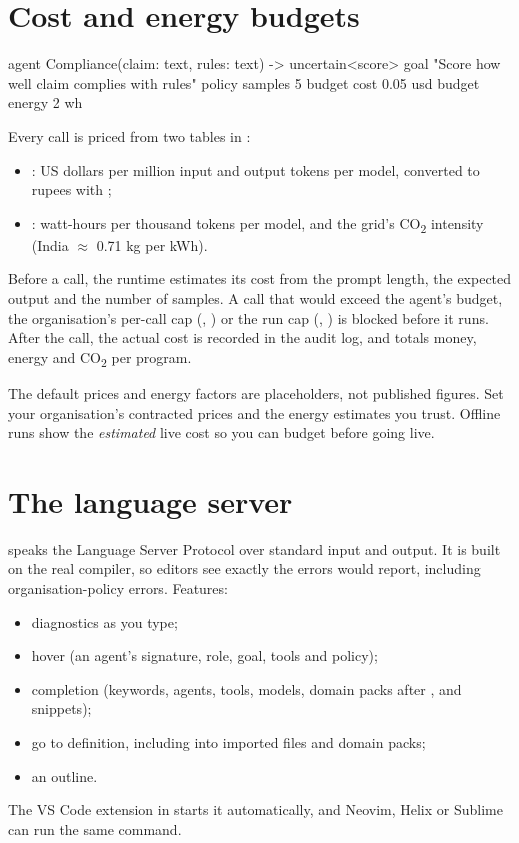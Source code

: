 \section{Cost and energy budgets}

\begin{algo}[title=Budgets]
agent Compliance(claim: text, rules: text) -> uncertain<score> {
    goal   "Score how well {claim} complies with {rules}"
    policy { samples 5  budget cost 0.05 usd  budget energy 2 wh }
}
\end{algo}

Every call is priced from two tables in :
\begin{itemize}
\item {}: US dollars per million input and output tokens per model, converted to rupees with ;
\item {}: watt-hours per thousand tokens per model, and the grid's CO\textsubscript{2} intensity (India $\approx$ 0.71 kg per kWh).
\end{itemize}

Before a call, the runtime estimates its cost from the prompt length, the expected output and the number of samples. A call that would exceed the agent's budget, the organisation's per-call cap (, ) or the run cap (, ) is blocked before it runs. After the call, the actual cost is recorded in the audit log, and  totals money, energy and CO\textsubscript{2} per program.

\begin{ethics}
The default prices and energy factors are placeholders, not published figures. Set your organisation's contracted prices and the energy estimates you trust. Offline runs show the \emph{estimated} live cost so you can budget before going live.
\end{ethics}

\section{The language server}

 speaks the Language Server Protocol over standard input and output. It is built on the real compiler, so editors see exactly the errors  would report, including organisation-policy errors. Features:
\begin{itemize}
\item diagnostics as you type;
\item hover (an agent's signature, role, goal, tools and policy);
\item completion (keywords, agents, tools, models, domain packs after , and snippets);
\item go to definition, including into imported files and domain packs;
\item an outline.
\end{itemize}
The VS Code extension in  starts it automatically, and Neovim, Helix or Sublime can run the same command.

